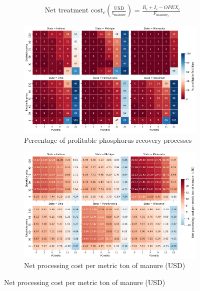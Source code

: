 \begin{refsection}[referencesCh5]
\begin{align}
& \text{Net treatment cost}_c \left(\frac{\text{USD}}{\text{t}_{\text{manure}}}\right) = \frac{R_{c} + I_{c} - OPEX_{c}}{F_{\text{manure}_{c}}} \label{eq:NetTreatCost}
\end{align}

\begin{figure}[h]
	\centering
	\begin{subfigure}[t]{0.89\textwidth}
		\centering
		\includegraphics[width=\linewidth]{gfx/Chapter5/DataAnalysisProfitable.pdf} 
		\caption{Percentage of profitable phosphorus recovery processes}
		\label{fig:PercProfitableStates_AllScenarios}
	\end{subfigure}
	\par\bigskip
	\begin{subfigure}[t]{0.89\textwidth}
		\centering
		\includegraphics[width=\linewidth]{gfx/Chapter5/TAC_tonManure.pdf}
		\caption{Net processing cost per metric ton of manure (USD)}
		\label{fig:TAC_kgManure_AllScenarios}
	\end{subfigure}
	

\end{figure}
\end{refsection}
